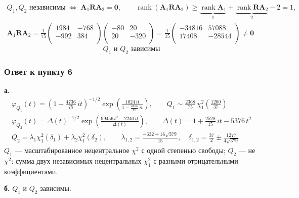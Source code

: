 \documentclass[12pt]{spbstu-task}
\begin{document}
\begin{gather*}
  Q_1, Q_2\text{ независимы}\;\Leftrightarrow\;\mathbf{A}_1\mathbf{R}\mathbf{A}_2 = \mathbf{0},\qquad
  \operatorname{rank}\left(\mathbf{A}_1\mathbf{R}\mathbf{A}_2\right) \geq \underbrace{\operatorname{rank}\mathbf{A}_1}_{1} + \underbrace{\operatorname{rank}\mathbf{R}\mathbf{A}_2}_{2} - 2 = 1, \\
  \mathbf{A}_1\mathbf{R}\mathbf{A}_2 = \frac{1}{75}\begin{pmatrix}
    1984 & -768 \\
    -992 & 384 \\
  \end{pmatrix}\begin{pmatrix}
    -80 & 20 \\
    20 & -320 \\
  \end{pmatrix} = \frac{1}{15}\begin{pmatrix}
    -34816 & 57088 \\
    17408 & -28544 \\
  \end{pmatrix} \neq \mathbf{0}
\end{gather*}
\begin{displaymath}
  \boxed{\;Q_1 \text{ и } Q_2 \text{ зависимы}\;}
\end{displaymath}
\subsubsection*{Ответ к пункту 6}
\textbf{а.}
\begin{gather*}
  \varphi_{Q_1}(t) = \left(1 - \frac{4736}{75}\,it\right)^{-1/2}\exp\left(\frac{1024\,it}{1 - \frac{4736}{75}\,it}\right),\qquad
  Q_1 \sim \frac{2368}{75}\,\chi^2_1\!\left(\frac{1200}{37}\right) \\
  \varphi_{Q_2}(t) = \Delta(t)^{-1/2}\exp\left(\frac{99456\,t^2 - 2240\,it}{\Delta(t)}\right),\qquad
  \Delta(t) = 1 + \frac{2528}{15}\,it - 5376\,t^2 \\
  Q_2 = \lambda_1\chi^2_1(\delta_1) + \lambda_2\chi^2_1(\delta_2),\qquad
  \lambda_{1,2} = \frac{-632 \mp 16\sqrt{379}}{15},\quad
  \delta_{1,2} = \frac{37}{2} \pm \frac{1277}{4\sqrt{379}}
\end{gather*}
\(Q_1\) --- масштабированное нецентральное \(\chi^2\) с одной степенью свободы;
\(Q_2\) --- не \(\chi^2\): сумма двух независимых нецентральных \(\chi^2_1\) с разными отрицательными коэффициентами.

\textbf{б.} \(Q_1\) и \(Q_2\) зависимы.
\end{document}
